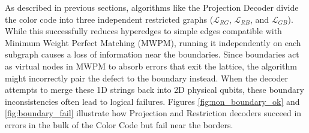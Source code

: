 As described in previous sections, algorithms like the Projection Decoder divide the color code into three independent restricted graphs ($\mathcal{L}_{RG}$, $\mathcal{L}_{RB}$, and $\mathcal{L}_{GB}$). While this successfully reduces hyperedges to simple edges compatible with Minimum Weight Perfect Matching (MWPM), running it independently on each subgraph causes a loss of information near the boundaries. Since boundaries act as virtual nodes in MWPM to absorb errors that exit the lattice, the algorithm might incorrectly pair the defect to the boundary instead. When the decoder attempts to merge these 1D strings back into 2D physical qubits, these boundary inconsistencies often lead to logical failures. Figures \ref{fig:non_boundary_ok} and \ref{fig:boundary_fail} illustrate how Projection and Restriction decoders succeed in errors in the bulk of the Color Code but fail near the borders.

